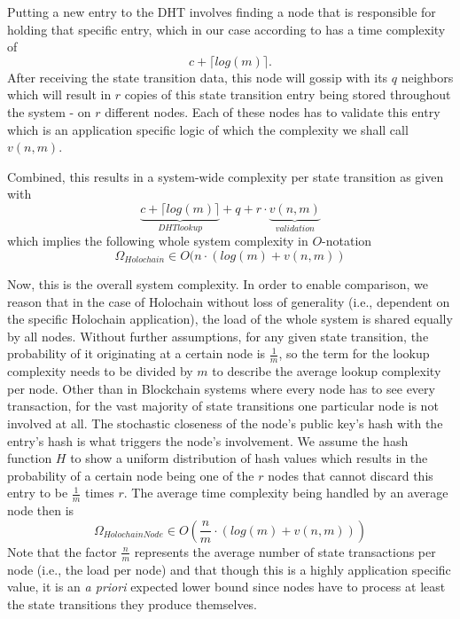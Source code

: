 \documentclass[twocolumn,showpacs,%
  nofootinbib,aps,superscriptaddress,%
  eqsecnum,prd,notitlepage,showkeys,10pt]{revtex4-1}
\begin{document}
Putting a new entry to the DHT involves finding a node that is responsible for holding that specific entry, which in our case according to \cite{kademlia} has a time complexity of \begin{equation}
c+\lceil{log(m)}\rceil.
\end{equation}
After receiving the state transition data, this node will gossip with its $q$ neighbors which will result in $r$ copies of this state transition entry being stored throughout the system - on $r$ different nodes. Each of these nodes has to validate this entry which is an application specific logic of which the complexity we shall call $v(n, m)$.

Combined, this results in a system-wide complexity per state transition as given with
\begin{equation}
\underbrace{c+\lceil{log(m)}\rceil}_{DHT lookup}
+ q + r \cdot
\underbrace{v(n,m)}_{validation}
\end{equation}
which implies the following whole system complexity in $O$-notation
\begin{equation}
\Omega_{Holochain} \in O(n\cdot(log(m) + v(n,m))
\end{equation}

Now, this is the overall system complexity. In order to enable comparison, we reason that in the case of Holochain without loss of generality (i.e., dependent on the specific Holochain application), the load of the whole system is shared equally by all nodes. Without further assumptions, for any given state transition, the probability of it originating at a certain node is $\frac{1}{m}$, so the term for the lookup complexity needs to be divided by $m$ to  describe the average lookup complexity per node. Other than in Blockchain systems where every node has to see every transaction, for the vast majority of state transitions one particular node is not involved at all. The stochastic closeness of the node's public key's hash with the entry's hash is what triggers the node's involvement. We assume the hash function $H$ to show a uniform distribution of hash values which results in the probability of a certain node being one of the $r$ nodes that cannot discard this entry to be $\frac{1}{m}$ times $r$.  The average time complexity being handled by an average node then is
\begin{equation}
\Omega_{HolochainNode} \in
O\left(\frac{n}{m}\cdot\left(log(m) + v(n,m)\right)\right)
\end{equation}
Note that the factor $\frac{n}{m}$ represents the average number of state transactions per node (i.e., the load per node) and that though this is a highly application specific value, it is an \textit{a priori }expected lower bound since nodes have to process at least the state transitions they produce themselves.
\end{document}
